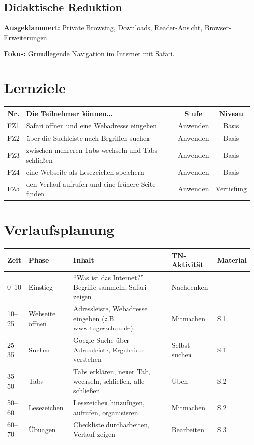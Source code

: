 \documentclass[11pt,a4paper]{article}
\begin{document}
\subsection{Didaktische Reduktion}
\textbf{Ausgeklammert:} Private Browsing, Downloads, Reader-Ansicht, Browser-Erweiterungen.

\textbf{Fokus:} Grundlegende Navigation im Internet mit Safari.

\section{Lernziele}

\begin{tabular}{|c|p{7cm}|c|c|}
\hline
\textbf{Nr.} & \textbf{Die Teilnehmer können...} & \textbf{Stufe} & \textbf{Niveau} \\
\hline
FZ1 & Safari öffnen und eine Webadresse eingeben & Anwenden & Basis \\
FZ2 & über die Suchleiste nach Begriffen suchen & Anwenden & Basis \\
FZ3 & zwischen mehreren Tabs wechseln und Tabs schließen & Anwenden & Basis \\
FZ4 & eine Webseite als Lesezeichen speichern & Anwenden & Basis \\
FZ5 & den Verlauf aufrufen und eine frühere Seite finden & Anwenden & Vertiefung \\
\hline
\end{tabular}

\section{Verlaufsplanung}

\begin{longtable}{|p{1cm}|p{2cm}|p{5cm}|p{3cm}|p{2cm}|}
\hline
\textbf{Zeit} & \textbf{Phase} & \textbf{Inhalt} & \textbf{TN-Aktivität} & \textbf{Material} \\
\hline
0--10 & Einstieg & ``Was ist das Internet?'' Begriffe sammeln, Safari zeigen & Nachdenken & -- \\
\hline
10--25 & Webseite öffnen & Adressleiste, Webadresse eingeben (z.B. www.tagesschau.de) & Mitmachen & S.1 \\
\hline
25--35 & Suchen & Google-Suche über Adressleiste, Ergebnisse verstehen & Selbst suchen & S.1 \\
\hline
35--50 & Tabs & Tabs erklären, neuer Tab, wechseln, schließen, alle schließen & Üben & S.2 \\
\hline
50--60 & Lesezeichen & Lesezeichen hinzufügen, aufrufen, organisieren & Mitmachen & S.2 \\
\hline
60--70 & Übungen & Checkliste durcharbeiten, Verlauf zeigen & Bearbeiten & S.3 \\
\hline
\end{longtable}
\end{document}
